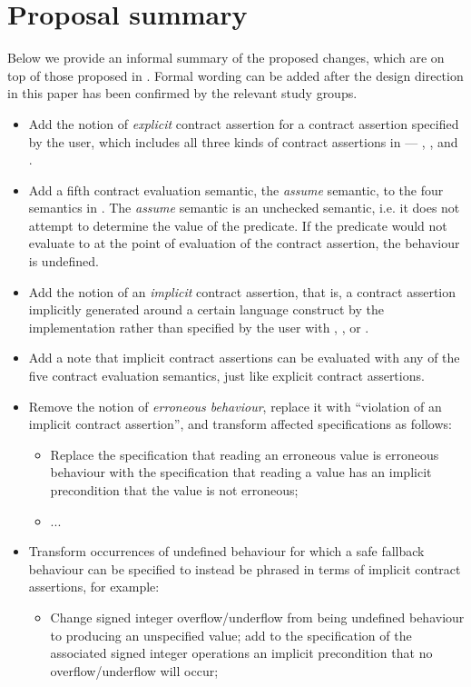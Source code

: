 \section{Proposal summary}
Below we provide an informal summary of the proposed changes, which are on top of those proposed in \cite{P2900R9}. Formal wording can be added after the design direction in this paper has been confirmed by the relevant study groups.

\begin{itemize}
\item Add the notion of \emph{explicit} contract assertion for a contract assertion specified by the user, which includes all three kinds of contract assertions in \cite{P2900R9} --- , , and .
\item Add a fifth contract evaluation semantic, the \emph{assume} semantic, to the four semantics in \cite{P2900R9}. The  \emph{assume} semantic is an unchecked semantic, i.e. it does not attempt to determine the value of the predicate. If the predicate would not evaluate to  at the point of evaluation of the contract assertion, the behaviour is undefined.
\item Add the notion of an \emph{implicit} contract assertion, that is, a contract assertion implicitly generated around a certain language construct by the implementation rather than specified by the user with , , or .
\item Add a note that implicit contract assertions can be evaluated with any of the five contract evaluation semantics, just like explicit contract assertions.
\item Remove the notion of \emph{erroneous behaviour}, replace it with ``violation of an implicit contract assertion'', and transform affected specifications as follows:
\begin{itemize}
\item Replace the specification that reading an erroneous value is erroneous behaviour with the specification that reading a value has an implicit precondition that the value is not erroneous;
\item ...
\end{itemize}
\item Transform occurrences of undefined behaviour for which a safe fallback behaviour can be specified to instead be phrased in terms of implicit contract assertions, for example:
\begin{itemize}
\item Change signed integer overflow/underflow from being undefined behaviour to producing an unspecified value; add to the specification of the associated signed integer operations an implicit precondition that no overflow/underflow will occur;

\end{itemize}
\end{itemize}
